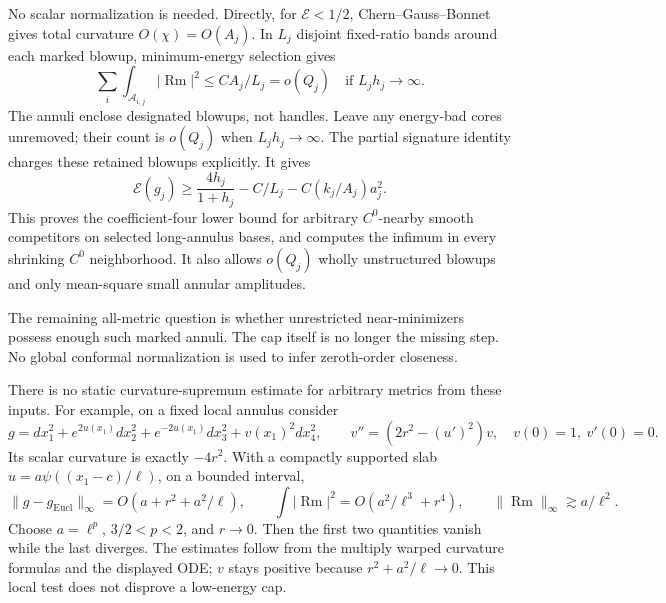 \documentclass[
  11pt,
]{article}
\begin{document}
No scalar normalization is needed. Directly, for \(\mathcal E<1/2\),
Chern--Gauss--Bonnet gives total curvature \(O(\chi)=O(A_j)\). In
\(L_j\) disjoint fixed-ratio bands around each marked blowup,
minimum-energy selection gives \[
 \sum_i\int_{\mathcal A_{i,j}}|\operatorname{Rm}|^2
        \le C A_j/L_j=o(Q_j)\quad\text{if }L_jh_j\to\infty.
                                                               \tag{5.1}
\] The annuli enclose designated blowups, not handles. Leave any
energy-bad cores unremoved; their count is \(o(Q_j)\) when
\(L_jh_j\to\infty\). The partial signature identity charges these
retained blowups explicitly. It gives \[
 \mathcal E(g_j)\ge\frac{4h_j}{1+h_j}
                      -C/L_j-C(k_j/A_j)a_j^2.        \tag{5.1a}
\] This proves the coefficient-four lower bound for arbitrary
\(C^0\)-nearby smooth competitors on selected long-annulus bases, and
computes the infimum in every shrinking \(C^0\) neighborhood. It also
allows \(o(Q_j)\) wholly unstructured blowups and only mean-square small
annular amplitudes.

The remaining all-metric question is whether unrestricted
near-minimizers possess enough such marked annuli. The cap itself is no
longer the missing step. No global conformal normalization is used to
infer zeroth-order closeness.

There is no static curvature-supremum estimate for arbitrary metrics
from these inputs. For example, on a fixed local annulus consider \[
 g=dx_1^2+e^{2u(x_1)}dx_2^2+e^{-2u(x_1)}dx_3^2
                  +v(x_1)^2dx_4^2,\qquad
 v''=(2r^2-(u')^2)v,\quad v(0)=1,\ v'(0)=0.
\] Its scalar curvature is exactly \(-4r^2\). With a compactly supported
slab \(u=a\psi((x_1-c)/\ell)\), on a bounded interval, \[
 \|g-g_{\mathrm{Eucl}}\|_\infty
       =O(a+r^2+a^2/\ell),\qquad
 \int|\operatorname{Rm}|^2=O(a^2/\ell^3+r^4),\qquad
 \|\operatorname{Rm}\|_\infty\gtrsim a/\ell^2 .
                                                               \tag{5.2}
\] Choose \(a=\ell^p\), \(3/2<p<2\), and \(r\to0\). Then the first two
quantities vanish while the last diverges. The estimates follow from the
multiply warped curvature formulas and the displayed ODE; \(v\) stays
positive because \(r^2+a^2/\ell\to0\). This local test does not disprove
a low-energy cap.
\end{document}
